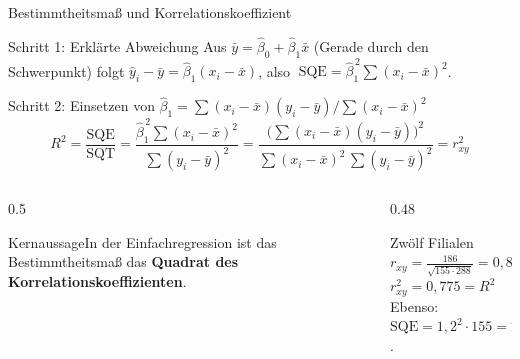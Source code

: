 \documentclass[aspectratio=169,11pt]{beamer}
\newcommand{\kernaussage}[1]{\begin{alertblock}{Kernaussage}#1\end{alertblock}}
\begin{document}
\begin{frame}{Bestimmtheitsmaß und Korrelationskoeffizient}
  \begin{block}{Schritt 1: Erklärte Abweichung}
    Aus $\bar{y} = \hat{\beta}_0 + \hat{\beta}_1 \bar{x}$ (Gerade durch den Schwerpunkt) folgt
    $\hat{y}_i - \bar{y} = \hat{\beta}_1 (x_i - \bar{x})$, also
    $\;\text{SQE} = \hat{\beta}_1^{\,2} \sum (x_i - \bar{x})^{2}$.
  \end{block}

  \begin{block}{Schritt 2: Einsetzen von $\hat{\beta}_1 = \sum (x_i-\bar{x})(y_i-\bar{y}) \big/ \sum (x_i-\bar{x})^{2}$}
    \vspace{-2pt}
    \[
      R^{2} = \frac{\text{SQE}}{\text{SQT}}
      = \frac{\hat{\beta}_1^{\,2} \sum (x_i-\bar{x})^{2}}{\sum (y_i-\bar{y})^{2}}
      = \frac{\bigl(\sum (x_i-\bar{x})(y_i-\bar{y})\bigr)^{2}}{\sum (x_i-\bar{x})^{2}\,\sum (y_i-\bar{y})^{2}}
      = r_{xy}^{2}
    \]
  \end{block}

  \begin{columns}[T]
    \begin{column}{0.5\textwidth}
      \kernaussage{In der Einfachregression ist das Bestimmtheitsmaß das
        \textbf{Quadrat des Korrelationskoeffizienten}.}
    \end{column}
    \begin{column}{0.48\textwidth}
      \begin{exampleblock}{Zwölf Filialen}
        $r_{xy} = \frac{186}{\sqrt{155 \cdot 288}} = 0{,}8803$\\
        $r_{xy}^{2} = 0{,}775 = R^{2}$ \checkmark \\
        Ebenso: $\text{SQE} = 1{,}2^{2} \cdot 155 = 223{,}2$.
      \end{exampleblock}
    \end{column}
  \end{columns}
\end{frame}
\end{document}
